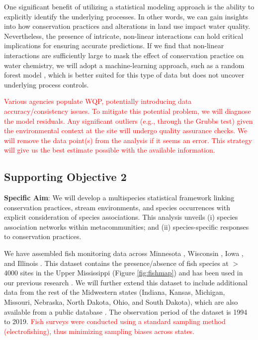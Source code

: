 \documentclass[12pt, class=article, crop=false]{standalone}
\begin{document}
One significant benefit of utilizing a statistical modeling approach is the ability to explicitly identify the underlying processes. In other words, we can gain insights into how conservation practices and alterations in land use impact water quality. Nevertheless, the presence of intricate, non-linear interactions can hold critical implications for ensuring accurate predictions. If we find that non-linear interactions are sufficiently large to mask the effect of conservation practice on water chemistry, we will adopt a machine-learning approach, such as a random forest model \citep{ryo_statistically_2017}, which is better suited for this type of data but does not uncover underlying process controls. 

\textcolor{red}{Various agencies populate WQP, potentially introducing data accuracy/consistency issues.
To mitigate this potential problem, we will diagnose the model residuals.
Any significant outliers (e.g., through the Grubbs test) given the environmental context at the site will undergo quality assurance checks.
We will remove the data point(s) from the analysis if it seems an error.
This strategy will give us the best estimate possible with the available information.}


\subsection{Supporting Objective 2}

\textbf{Specific Aim}: We will develop a multispecies statistical framework linking conservation practices, stream environments, and species occurrences with explicit consideration of species associations.
This analysis unveils (i) species association networks within metacommunities; and (ii) species-specific responses to conservation practices. 

We have assembled fish monitoring data across Minnesota \citep{minnesota_pollution_control_agency_development_2014}, Wisconsin \citep{wisconsin_department_of_natural_resources_guidelines_2018}, Iowa \citep{iowa_department_of_natural_resources_biological_2004}, and Illinois \citep{illinois_environmental_protection_agency_illinois_2014}.
This dataset contains the presence/absence of fish species at $>$ 4000 sites in the Upper Mississippi (Figure \ref{fig:fishmap}) and has been used in our previous research \citep{kim_metapopulation-level_2022, terui_emergent_2021}.
We will further extend this dataset to include additional data from the rest of the Midwestern states (Indiana, Kansas, Michigan, Missouri, Nebraska, North Dakota, Ohio, and South Dakota), which are also available from a public database \citep{hao_presence_2022}.
The observation period of the dataset is 1994 to 2019.
\textcolor{red}{Fish surveys were conducted using a standard sampling method (electrofishing), thus minimizing sampling biases across states.}
\end{document}
